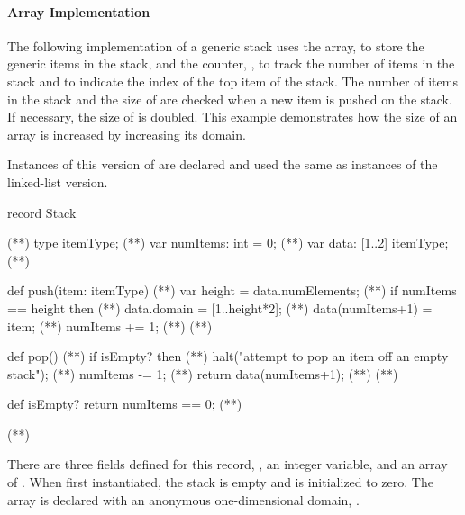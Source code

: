 \paragraph{Array Implementation}
The following implementation of a generic stack uses the array,
 to store the generic items in the stack, and the
counter, , to track the
number of items in the stack and to indicate the index of
the top item of the stack.  The number of items in the stack
and the size of  are checked when a new item is pushed
on the stack.  If necessary, the size of  is doubled.
This example demonstrates how the size of an array is increased 
by increasing its domain.

Instances of this version of  are declared and
used the same as instances of the linked-list version.

\begin{numberedchapel}
record Stack {                     (*\label{stack_array_start}*)
  type itemType;                   (*\label{stack_array_itemtype}*)
  var numItems: int = 0;           (*\label{stack_array_numitems}*)
  var data: [1..2] itemType;       (*\label{stack_array_data}*)

  def push(item: itemType) {       (*\label{stack_array_push_start}*)
    var height = data.numElements;  (*\label{stack_array_push_height}*)
    if numItems == height then      (*\label{stack_array_push_check_height}*)
      data.domain = [1..height*2];  (*\label{stack_array_push_incr_dom}*)
    data(numItems+1) = item;        (*\label{stack_array_push_new_item}*)
    numItems += 1;                  (*\label{stack_array_push_num_incr}*)
  }                                 (*\label{stack_array_push_end}*)

  def pop() {                       (*\label{stack_array_pop_start}*)
    if isEmpty? then                (*\label{stack_array_pop_empty_1}*)
      halt("attempt to pop an item off an empty stack"); (*\label{stack_array_pop_empty_2}*)
    numItems -= 1;                  (*\label{stack_array_pop_num_dec}*)
    return data(numItems+1);        (*\label{stack_array_pop_return}*)
  }                                 (*\label{stack_array_pop_end}*)

  def isEmpty? return numItems == 0; (*\label{stack_array_isempty}*)
}                                   (*\label{stack_array_end}*)
\end{numberedchapel}

There are three fields defined for this  record, ,
an integer variable,  and an array  of .
When first instantiated,
the stack is empty and  is initialized to zero.   The 
array is declared with an anonymous one-dimensional domain, \chpl{[1..2]}.

